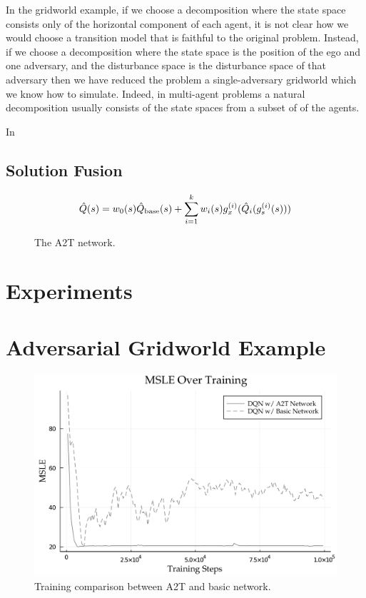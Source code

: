 In the gridworld example, if we choose a decomposition where the state space consists only of the horizontal component of each agent, it is not clear how we would choose a transition model that is faithful to the original problem. Instead, if we choose a decomposition where the state space is the position of the ego and one adversary, and the disturbance space is the disturbance space of that adversary then we have reduced the problem a single-adversary gridworld which we know how to simulate. Indeed, in multi-agent problems a natural decomposition usually consists of the state spaces from a subset of of the agents. 

In 

\subsection{Solution Fusion}

\begin{equation}
\hat{Q}(s) = w_0(s) \hat{Q}_{\rm base}(s) + \sum_{i=1}^k w_i(s) g_x^{(i)}(\hat{Q}_i(g_s^{(i)}(s)))
\end{equation}

\begin{figure}[!t]
\centering

\caption{The A2T network. }
\label{fig:A2T_Network}
\vskip -0.5cm
\end{figure}



\section{Experiments}

\section{Adversarial Gridworld Example}

\begin{figure}
        \centering
        \includegraphics[width=\textwidth]{figures/scene_decomposition/training_comparison.pdf}
        \caption{Training comparison between A2T and basic network.}
        \label{fig:ch5_adv_gridworld_training}
\end{figure}


